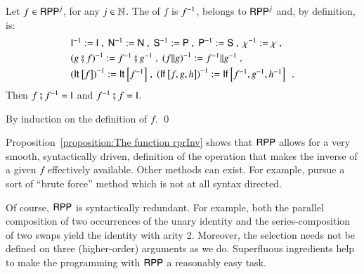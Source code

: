 \begin{proposition}
\label{proposition:The function rprInv}
Let $ f\in\mathsf{RPP}^{j}$, for any $ j\in\mathbb{N} $. The \rprInvName of $ f$ is
$ {f}^{-1}$, belongs to $ \mathsf{RPP}^{j} $ and, by definition, is:
$$ 
\begin{array}{l}
{\mathsf{I}}^{-1} := \mathsf{I}   \;,\; {\mathsf{N}}^{-1}    := \mathsf{N}  
                            \;,\;  {\mathsf{S}}^{-1}  := \mathsf{P}  
                            \;,\;   {\mathsf{P}}^{-1} := \mathsf{S}    
                            \;,\;  {\chi}^{-1} := \chi   \;,\;  \\[1mm]
                            {(g\fatsemi f)}^{-1} := {f}^{-1}\fatsemi {g}^{-1} 
                             \;,\;   {(f \rVert g)}^{-1} := {f}^{-1} \rVert {g}^{-1}  \;,\;  \\[1mm]
                              {({\mathsf{It}^{}_{}\left[ f \right]})}^{-1}       := {\mathsf{It}^{}_{}\left[ {f}^{-1} \right]}  
                            \;,\; {(\mathsf{If}^{}_{}\left[f,g,h\right])}^{-1}  := \mathsf{If}^{}_{}\left[{f}^{-1},{g}^{-1},{h}^{-1}\right]
  \enspace .
\end{array}
$$
Then $ f\fatsemi {f}^{-1} = \mathsf{I} $ and ${f}^{-1}\fatsemi f = \mathsf{I} $.
\end{proposition}
\begin{prf}
By induction on the definition of $ f $.
\qed
\end{prf}
\noindent
Proposition~\ref{proposition:The function rprInv} shows that $ \mathsf{RPP} $ allows for a very smooth, syntactically driven, 
definition of the operation that makes the inverse of a given $ f $ effectively available. Other methods can exist. For example, 
\cite{McC56,robinson1950pams} pursue a sort of ``brute force'' method which is not at all syntax directed.

	Of course, $\mathsf{RPP}$ is syntactically redundant.
	For example, 
	both the parallel composition of two occurrences of the unary identity and
	the series-composition of two swaps yield the identity with arity 2.
	Moreover, the selection needs not be defined on three (higher-order) arguments as we do.
	Superfluous ingredients help to make the programming with $ \mathsf{RPP} $ a  reasonably easy task.


